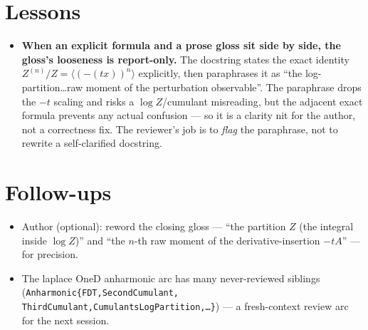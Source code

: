 \documentclass[11pt]{article}
\begin{document}
\section{Lessons}
\begin{itemize}[noitemsep]
  \item \textbf{When an explicit formula and a prose gloss sit side by side, the gloss's looseness is
    report-only.} The docstring states the exact identity $Z^{(n)}/Z=\langle(-(t x))^n\rangle$ explicitly, then
    paraphrases it as ``the log-partition\ldots raw moment of the perturbation observable''. The paraphrase
    drops the $-t$ scaling and risks a $\log Z$/cumulant misreading, but the adjacent exact formula prevents
    any actual confusion --- so it is a clarity nit for the author, not a correctness fix. The reviewer's job
    is to \emph{flag} the paraphrase, not to rewrite a self-clarified docstring.
\end{itemize}

\section{Follow-ups}
\begin{itemize}[noitemsep]
  \item Author (optional): reword the closing gloss --- ``the partition $Z$ (the integral inside $\log Z$)''
    and ``the $n$-th raw moment of the derivative-insertion $-tA$'' --- for precision.
  \item The laplace OneD anharmonic arc has many never-reviewed siblings (\texttt{Anharmonic\{FDT,SecondCumulant,
    ThirdCumulant,CumulantsLogPartition,\ldots\}}) --- a fresh-context review arc for the next session.
\end{itemize}
\end{document}
